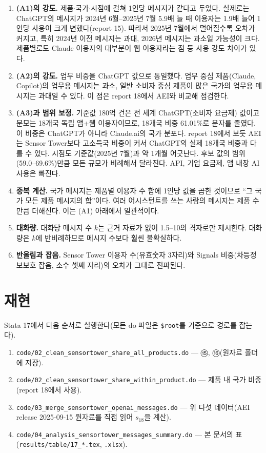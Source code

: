 \documentclass[11pt]{article}
\begin{document}
\begin{enumerate}[leftmargin=*]
  \item \textbf{(A1)의 강도.} 제품$\cdot$국가$\cdot$시점에 걸쳐 1인당 메시지가 같다고 두었다. 실제로는 ChatGPT의 메시지가 2024년 6월--2025년 7월 5.9배 늘 때 이용자는 1.9배 늘어 1인당 사용이 크게 변했다(report 15). 따라서 2025년 7월에서 멀어질수록 오차가 커지고, 특히 2024년 이전 메시지는 과대, 2026년 메시지는 과소일 가능성이 크다. 제품별로도 Claude 이용자의 대부분이 웹 이용자라는 점 등 사용 강도 차이가 있다.
  \item \textbf{(A2)의 강도.} 업무 비중을 ChatGPT 값으로 통일했다. 업무 중심 제품(Claude, Copilot)의 업무용 메시지는 과소, 일반 소비자 중심 제품이 많은 국가의 업무용 메시지는 과대일 수 있다. 이 점은 report 18에서 AEI와 비교해 점검한다.
  \item \textbf{(A3)과 범위 보정.} 기준값 180억 건은 전 세계 ChatGPT(소비자 요금제) 값이고 분모는 18개국 독립 앱+웹 이용자이므로, 18개국 비중 61.01\%로 분자를 줄였다. 이 비중은 ChatGPT가 아니라 Claude.ai의 국가 분포다. report 18에서 보듯 AEI는 Sensor Tower보다 고소득국 비중이 커서 ChatGPT의 실제 18개국 비중과 다를 수 있다. 시점도 기준값(2025년 7월)과 약 1개월 어긋난다. 후보 값의 범위(59.0--69.6\%)만큼 모든 규모가 비례해서 달라진다. API, 기업 요금제, 앱 내장 AI 사용은 빠진다.
  \item \textbf{중복 계산.} 국가 메시지는 제품별 이용자 수 합에 1인당 값을 곱한 것이므로 ``그 국가 모든 제품 메시지의 합''이다. 여러 어시스턴트를 쓰는 사람의 메시지는 제품 수만큼 더해진다. 이는 (A1) 아래에서 일관적이다.
  \item \textbf{대화량.} 대화당 메시지 수 $k$는 근거 자료가 없어 1.5--10의 격자로만 제시한다. 대화량은 $k$에 반비례하므로 메시지 수보다 훨씬 불확실하다.
  \item \textbf{반올림과 잡음.} Sensor Tower 이용자 수(유효숫자 3자리)와 Signals 비중(차등정보보호 잡음, 소수 셋째 자리)의 오차가 그대로 전파된다.
\end{enumerate}

\section{재현}

Stata 17에서 다음 순서로 실행한다(모든 do 파일은 \texttt{\$root}를 기준으로 경로를 잡는다).
\begin{enumerate}[leftmargin=*]
  \item \texttt{code/02\_clean\_sensortower\_share\_all\_products.do} --- ⑮, ⑯(원자료 폴더에 저장).
  \item \texttt{code/02\_clean\_sensortower\_share\_within\_product.do} --- 제품 내 국가 비중(report 18에서 사용).
  \item \texttt{code/03\_merge\_sensortower\_openai\_messages.do} --- 위 다섯 데이터(AEI release 2025-09-15 원자료를 직접 읽어 $s_{18}$을 계산).
  \item \texttt{code/04\_analysis\_sensortower\_messages\_summary.do} --- 본 문서의 표(\texttt{results/table/17\_*.tex}, \texttt{.xlsx}).
\end{enumerate}

\printbibliography[title={참고문헌}]
\end{document}
